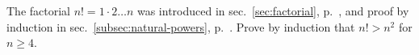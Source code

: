 The factorial $n!=1\cdot2\ldots n$ was
introduced in sec.~\ref{sec:factorial}, p.~\pageref{sec:factorial}, and
proof by induction in sec.~\ref{subsec:natural-powers}, p.~\pageref{induction}.
Prove by induction that $n!>n^2$ for $n\ge4$.
